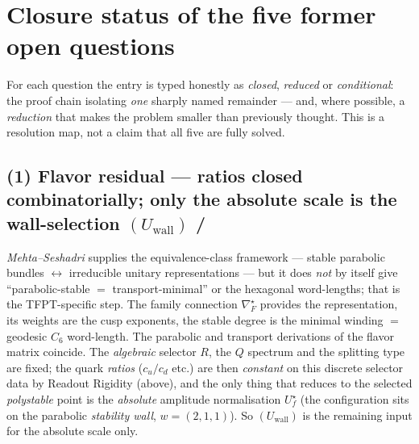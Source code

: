 \section{Closure status of the five former open questions}
For each question the entry is typed honestly as \emph{closed}, \emph{reduced} or \emph{conditional}: the
proof chain isolating \emph{one} sharply named remainder --- and, where possible, a \emph{reduction} that
makes the problem smaller than previously thought. This is a resolution map, not a claim that all five are
fully solved.

\subsection*{(1) Flavor residual --- ratios closed combinatorially; only the absolute scale is the wall-selection $(U_{\mathrm{wall}})$ \mE/\mO}
\emph{Mehta--Seshadri} supplies the equivalence-class framework --- stable parabolic bundles
$\leftrightarrow$ irreducible unitary representations --- but it does \emph{not} by itself give
``parabolic-stable $=$ transport-minimal'' or the hexagonal word-lengths; that is the TFPT-specific step.
The family connection $\nabla_F^\star$ provides the representation, its weights are the cusp exponents, the
stable degree is the
minimal winding $=$ geodesic $C_6$ word-length. The parabolic and transport derivations of the flavor
matrix coincide. The \emph{algebraic} selector $R$, the $Q$ spectrum and the splitting type are fixed; the
quark \emph{ratios} ($c_u/c_d$ etc.) are then \emph{constant} on this discrete selector data by Readout
Rigidity (above), and the only thing that reduces to the selected \emph{polystable} point is the
\emph{absolute} amplitude normalisation $U_f^\star$ (the configuration sits on the parabolic \emph{stability
wall}, $w=(2,1,1)$). So $(U_{\mathrm{wall}})$ is the remaining input for the absolute scale only.

